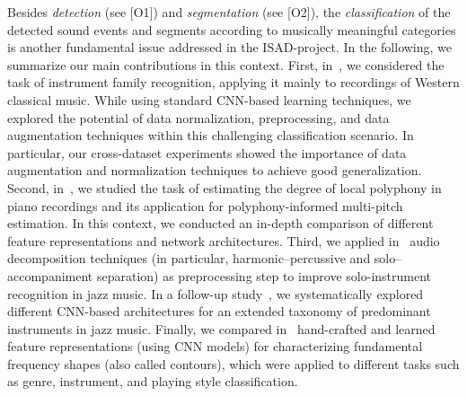 \documentclass[11pt,a4paper]{article}
\def\PN{\mathrm{ISAD}}
\theoremstyle{plain} \newtheorem{define}{Definition}[section]
\begin{document}
\begin{enumerate}
%
Besides \emph{detection} (see [O1]) and \emph{segmentation} (see [O2]), the \emph{classification} of the detected sound events and segments according to musically meaningful categories is another fundamental issue addressed in the $\PN$-project. In the following, we summarize our main contributions in this context.
%
First, in~\cite{TaenzerAMWLM19_InstrumentReco_ISMIR}, we considered the task of instrument family recognition, applying it mainly to recordings of Western classical music. While using standard CNN-based learning techniques, we explored the potential of data normalization, preprocessing, and data augmentation techniques within this challenging classification scenario. In particular, our cross-dataset experiments showed the importance of data augmentation and normalization techniques to achieve good generalization.
%
Second, in~\cite{TaenzerMA21_LocalPolyphonyEstimation_Electronics}, we studied the task of estimating the degree of local polyphony in piano recordings and its application for polyphony-informed multi-pitch estimation. In this context, we conducted an in-depth comparison of different feature representations and network architectures.
%
Third, we applied in~\cite{AbesserCTPM21_InstrumentJazz_EUSIPCO} audio decomposition techniques (in particular, harmonic--percussive and solo--accompaniment separation) as preprocessing step to improve solo-instrument recognition in jazz music.  
%
In a follow-up study~\cite{AbesserCTPM21_InstrumentJazz_EUSIPCO}, we systematically explored different CNN-based architectures for an extended taxonomy of predominant instruments in jazz music.
%
Finally, we compared in~\cite{AbesserMueller19_ContourClassification_ICASSP} hand-crafted and learned feature representations (using CNN models) for characterizing fundamental frequency shapes (also called contours), which were applied to different tasks such as genre, instrument, and playing style classification. 


\end{enumerate}
\end{document}
